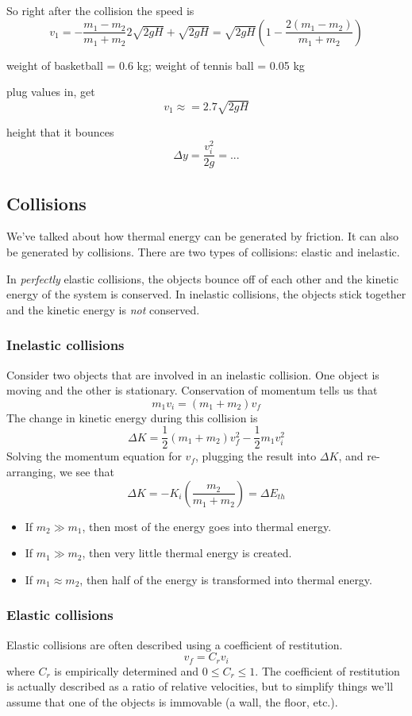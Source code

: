So right after the collision the speed is
$$v_1 = -\frac{m_1-m_2}{m_1+m_2}2\sqrt{2gH}+\sqrt{2gH}=\sqrt{2gH}\left(1-\frac{2(m_1-m_2)}{m_1+m_2}\right)$$

weight of basketball = 0.6 kg; weight of tennis ball = 0.05 kg

plug values in, get
$$v_1 \approx = 2.7\sqrt{2gH}$$

height that it bounces
$$\Delta y = \frac{v_i^2}{2g}=...$$


\subsection{Collisions}
We've talked about how thermal energy can be generated by friction. It can also be generated by collisions. There are two types of collisions: elastic and inelastic. 

In \textit{perfectly} elastic collisions, the objects bounce off of each other and the kinetic energy of the system is conserved. In inelastic collisions, the objects stick together and the kinetic energy is \textit{not} conserved.

\subsubsection{Inelastic collisions}
Consider two objects that are involved in an inelastic collision. One object is moving and the other is stationary. Conservation of momentum tells us that
$$m_1v_i=(m_1+m_2)v_f$$
The change in kinetic energy during this collision is
$$\Delta{K}=\frac{1}{2}(m_1+m_2)v_f^2-\frac{1}{2}m_1v_i^2$$
Solving the momentum equation for $v_f$, plugging the result into $\Delta{K}$, and re-arranging, we see that
$$\Delta{K}=-K_i\left(\frac{m_2}{m_1+m_2}\right)=\Delta{E_{th}}$$
\begin{itemize}
\item If $m_2\gg m_1$, then most of the energy goes into thermal energy. 
\item If $m_1\gg m_2$, then very little thermal energy is created. 
\item If $m_1\approx m_2$, then half of the energy is transformed into thermal energy.
\end{itemize}

\subsubsection{Elastic collisions}
Elastic collisions are often described using a coefficient of restitution.
$$v_f=C_rv_i$$
where $C_r$ is empirically determined and $0\leq C_r \leq 1$. The coefficient of restitution is actually described as a ratio of relative velocities, but to simplify things we'll assume that one of the objects is immovable (a wall, the floor, etc.).

